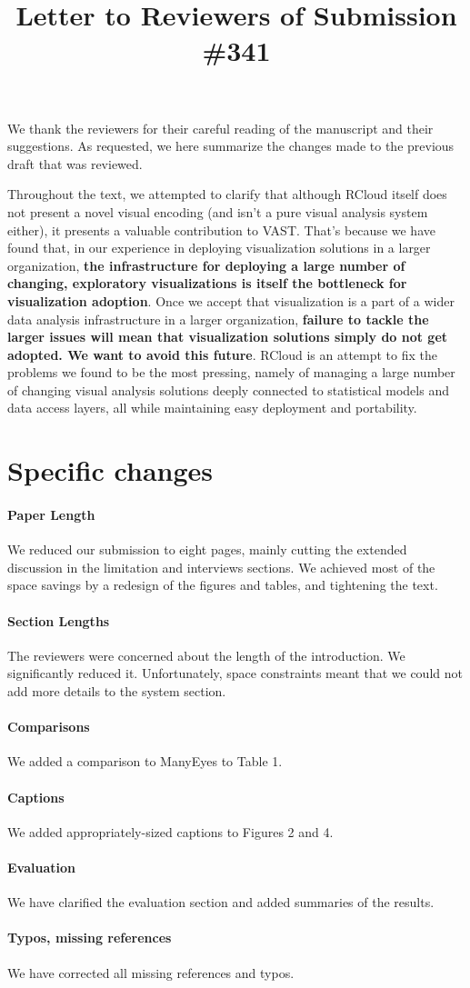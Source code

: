 \documentclass{article}
\title{Letter to Reviewers of Submission \#341}
\begin{document}
\maketitle

We thank the reviewers for their careful reading of the manuscript and
their suggestions. As requested, we here summarize the changes
made to the previous draft that was reviewed.

Throughout the text, we attempted to clarify that although RCloud
itself does not present a novel visual encoding (and isn't a pure
visual analysis system either), it presents a valuable contribution
to VAST. That's because we have found that, in
our experience in deploying visualization solutions in a larger
organization, \textbf{the infrastructure for deploying a large number of
changing, exploratory visualizations is itself the bottleneck for
visualization adoption}. Once we accept that visualization is a part
of a wider data analysis infrastructure in a larger organization,
\textbf{failure to tackle the larger issues will mean that visualization
solutions simply do not get adopted. We want to avoid this future}.
RCloud is an attempt to fix the problems we found to be the most
pressing, namely of managing a large number of changing visual
analysis solutions deeply connected to statistical models and data
access layers, all while maintaining easy deployment and portability.

\section*{Specific changes}

\paragraph*{Paper Length} We reduced our submission to eight pages,
mainly cutting the extended discussion in the limitation
and interviews sections. We achieved most of the space savings
by a redesign of the figures and tables, and tightening
the text.

\paragraph*{Section Lengths} The reviewers were concerned about the length
of the introduction. We significantly reduced it. Unfortunately,
space constraints meant that we could not add more details to the
system section.

\paragraph*{Comparisons} We added a comparison to ManyEyes to Table 1.

\paragraph*{Captions} We added appropriately-sized captions to Figures 2 and 4.

\paragraph*{Evaluation} We have clarified the evaluation section and added summaries of the results.

\paragraph*{Typos, missing references} We have corrected all missing references and typos.
\end{document}
